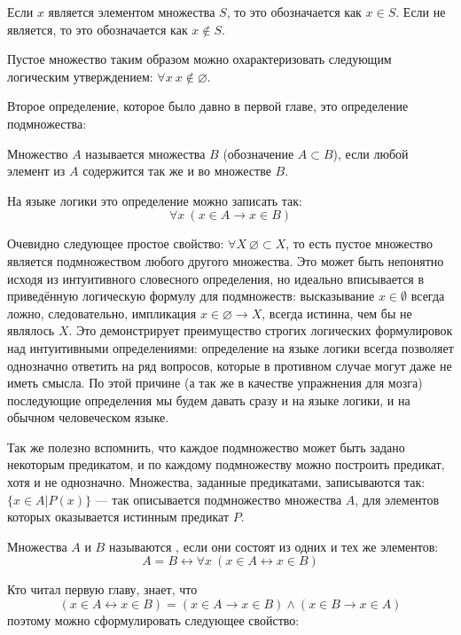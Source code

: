 Если $x$ является элементом множества $S$, то это обозначается как $x \in S$. Если не является, то это обозначается как $x \not\in S$.

Пустое множество таким образом можно охарактеризовать следующим логическим утверждением: $\forall x\ x \not \in \varnothing$.

Второе определение, которое было давно в первой главе, это определение подмножества:

\begin{definition}
Множество $A$ называется  множества $B$ (обозначение $A\subset B$), если любой элемент из $A$ содержится так же и во множестве $B$.
\end{definition}

На языке логики это определение можно записать так:
$$\forall x\ (x\in A\rightarrow x\in B)$$

Очевидно следующее простое свойство: $\forall X\ \varnothing\subset X$, то есть пустое множество является подмножеством любого другого множества. Это может быть непонятно исходя из интуитивного словесного определения, но идеально вписывается в приведённую логическую формулу для подмножеств: высказывание $x\in\emptyset$ всегда ложно, следовательно, импликация $x\in\varnothing \rightarrow X$, всегда истинна, чем бы не являлось $X$. Это демонстрирует преимущество строгих логических формулировок над интуитивными определениями: определение на языке логики всегда позволяет однозначно ответить на ряд вопросов, которые в противном случае могут даже не иметь смысла. По этой причине (а так же в качестве упражнения для мозга) последующие определения мы будем давать сразу и на языке логики, и на обычном человеческом языке.

Так же полезно вспомнить, что каждое подмножество может быть задано некоторым предикатом, и по каждому подмножеству можно построить предикат, хотя и не однозначно. Множества, заданные предикатами, записываются так: $\{x \in A|P(x)\}$ — так описывается подмножество множества $A$, для элементов которых оказывается истинным предикат $P$.

\begin{definition}
Множества $A$ и $B$ называются , если они состоят из одних и тех же элементов:
$$A=B \leftrightarrow \forall x\ (x\in A \leftrightarrow x\in B)$$
\end{definition}

Кто читал первую главу, знает, что
$$(x\in A \leftrightarrow x\in B) = (x \in A \rightarrow x \in B) \wedge (x \in B \rightarrow x \in A)$$
поэтому можно сформулировать следующее свойство:

